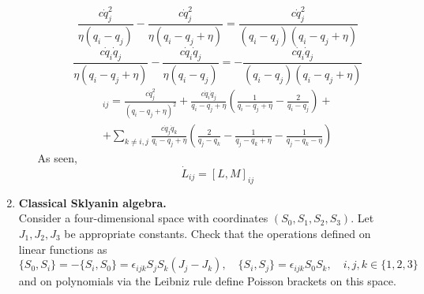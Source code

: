 \documentclass[12pt]{article}
\theoremstyle{definition}
\begin{document}
\begin{enumerate}
\begin{itemize}
\begin{multline}
        \end{multline}
        \begin{equation}
            \frac{c\dot{q}_j^2}{\eta(q_i-q_j)}-\frac{c\dot{q}_j^2}{\eta(q_i-q_j+\eta)}=\frac{c\dot{q}_j^2}{(q_i-q_j)(q_i-q_j+\eta)}
        \end{equation}
        \begin{equation}
            \frac{c\dot{q}_i\dot{q}_j}{\eta(q_i-q_j+\eta)}-\frac{c\dot{q}_i\dot{q}_j}{\eta(q_i-q_j)}=-\frac{c\dot{q}_i\dot{q}_j}{(q_i-q_j)(q_i-q_j+\eta)}
        \end{equation}
        \begin{multline}
            [L,M]_{ij}=\frac{c\dot{q}_j^2}{(q_i-q_j+\eta)^2}+\frac{c\dot{q}_i\dot{q}_j}{q_i-q_j+\eta}\left(\frac{1}{q_i-q_j+\eta}-\frac{2}{q_i-q_j}\right)+\\+\sum\limits_{k\neq i,j}\frac{c\dot{q}_j\dot{q}_k}{q_i-q_j+\eta}\left(\frac{2}{q_j-q_k}-\frac{1}{q_j-q_k+\eta}-\frac{1}{q_j-q_k-\eta}\right)
        \end{multline}
        As seen,
        \begin{equation}
            \dot{L}_{ij}=[L,M]_{ij}
        \end{equation}
    \end{itemize}
    \item \textbf{Classical Sklyanin algebra.}\\
    Consider a four-dimensional space with coordinates $(S_0, S_1, S_2, S_3)$. Let $J_1, J_2, J_3$ be appropriate constants. Check that the operations defined on linear functions as
    \begin{equation}
        \{S_0,S_i\}=-\{S_i,S_0\}=\epsilon_{ijk}S_jS_k(J_j-J_k),\quad \{S_i,S_j\}=\epsilon_{ijk}S_0S_k,\quad i,j,k\in\{1,2,3\}
    \end{equation}
    and on polynomials via the Leibniz rule define Poisson brackets on this space.\\

\end{enumerate}
\end{document}
